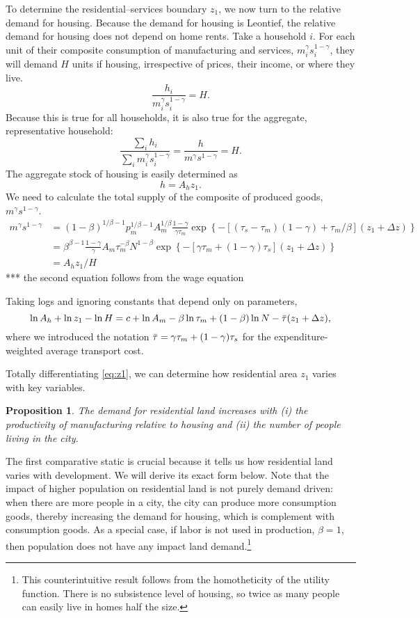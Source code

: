 \documentclass[12pt]{article}
\newtheorem{proposition}{Proposition}
\begin{document}
To determine the residential--services boundary $z_1$, we now turn to the relative demand for housing. Because the demand for housing is Leontief, the relative demand for housing does not depend on home rents. Take a household $i$. For each unit of their composite consumption of manufacturing and services, $m_i^\gamma s_i^{1-\gamma}$, they will demand $H$ units if housing, irrespective of prices, their income, or where they live.
\[
 \frac{h_i}{m_i^\gamma s_i^{1-\gamma}} = H.
\]
Because this is true for all households, it is also true for the aggregate, representative household:
\[
 \frac{\sum_{i}h_i}{\sum_i m_i^\gamma s_i^{1-\gamma}} =\frac{h}{m^\gamma s^{1-\gamma}}= H.
\]
The aggregate stock of housing is easily determined as
\[
 h = A_h z_1.
\]
We need to calculate the total supply of the composite of produced goods, $m^\gamma s^{1-\gamma}$. 
\begin{align}
 m^\gamma s^{1-\gamma} &= (1-\beta)^{1/\beta-1} p_m^{1/\beta-1} A_m^{1/\beta} \frac{1-\gamma}{\gamma\tau_m}
\exp\left\{
-[(\tau_s-\tau_m)(1-\gamma)+\tau_m/\beta](z_1+\Delta z)
\right\}\\
&=\beta^{\beta-1}\frac{1-\gamma}{\gamma}A_m\tau_m^{-\beta} N^{1-\beta}
\exp\left\{
-[\gamma\tau_m+(1-\gamma)\tau_s](z_1+\Delta z)
\right\}\\
&= A_hz_1/H
\end{align}
*** the second equation follows from the wage equation

Taking logs and ignoring constants that depend only on parameters,
\begin{equation}\label{eq:z1}
 \ln A_h +\ln z_1 - \ln H =
c+\ln A_m-\beta\ln\tau_m+(1-\beta)\ln N
-\Bar\tau(z_1+\Delta z),
\end{equation}
where we introduced the notation $\Bar\tau = \gamma\tau_m+(1-\gamma)\tau_s$ for the expenditure-weighted average transport cost. 

Totally differentiating \eqref{eq:z1}, we can determine how residential area $z_1$ varies with key variables.
\begin{proposition}
 The demand for residential land increases with (i) the productivity of manufacturing relative to housing and (ii) the number of people living in the city.
\end{proposition}
The first comparative static is crucial because it tells us how residential land varies with development. We will derive its exact form below. Note that the impact of higher population on residential land is not purely demand driven: when there are more people in a city, the city can produce more consumption goods, thereby increasing the demand for housing, which is complement with consumption goods. As a special case, if labor is not used in production, $\beta=1$, then population does not have any impact land demand.\footnote{This counterintuitive result follows from the homotheticity of the utility function. There is no subsistence level of housing, so twice as many people can easily live in homes half the size.}
\end{document}
